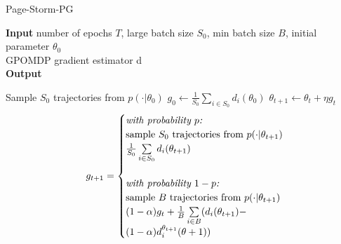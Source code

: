 \documentclass[10pt,twocolumn,letterpaper]{article}
\begin{document}
\begin{algorithm} 
\caption{Page-Storm-PG} \label{alg: page_storm}
\hspace*{\algorithmicindent} \textbf{Input} number of epochs $T$, large batch size $S_0$,
 \hspace*{\algorithmicindent}\hspace*{\algorithmicindent}min batch size $B$, initial parameter $\theta_0$ \\
 \hspace*{\algorithmicindent}\hspace*{\algorithmicindent}GPOMDP gradient estimator d \\
\hspace*{\algorithmicindent} \textbf{Output} 
\begin{algorithmic}[1]
\State Sample $S_0$ trajectories from $p(\cdot|\theta_0)$
\State $g_0 \gets \frac{1}{S_0}\sum_{i\in S_0} d_i(\theta_0)$
\State $\theta_{t+1} \gets \theta_t + \eta g_t$
\State
\hspace*{\algorithmicindent} $$
  \hspace*{\algorithmicindent}g_{t+1} =
    \begin{cases}
    \textit{with probability $p$:}\\
    \text{sample $S_0$ trajectories from $p(\cdot|\theta_{t+1})$} \\
    \frac{1}{S_0}\sum\limits_{i\in S_0}d_i(\theta_{t+1}) \\
       \\
        \textit{with probability $1-p$:} \\ 
        \text{sample $B$ trajectories from $p(\cdot|\theta_{t+1})$}\\
       (1 -\alpha)g_t+\frac{1}{B}\sum\limits_{i\in B}(d_i(\theta_{t+1})- \\ (1 -\alpha)d_i^{\theta_{t+1}}(\theta+1)) \\
       
      
    \end{cases}
$$
\EndFor
\end{algorithmic}
\end{algorithm}
\end{document}
